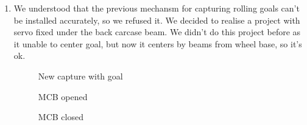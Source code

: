 \begin{enumerate}
\begin{enumerate}
		\item We understood that the previous mechansm for capturing rolling goals can't be installed accurately, so we refused it. We decided to realise a project with servo fixed under the back carcase beam. We didn't do this project before as it unable to center goal, but now it centers by beams from wheel base, so it's ok.
		\begin{figure}[H]
			\begin{minipage}[h]{0.31\linewidth}
				\caption{New capture with goal}
			\end{minipage}
			\hfill
			\begin{minipage}[h]{0.31\linewidth}
				\caption{MCB opened}
			\end{minipage}
			\hfill
			\begin{minipage}[h]{0.31\linewidth}
				\caption{MCB closed}
			\end{minipage}
		\end{figure}
		

\end{enumerate}
\end{enumerate}

